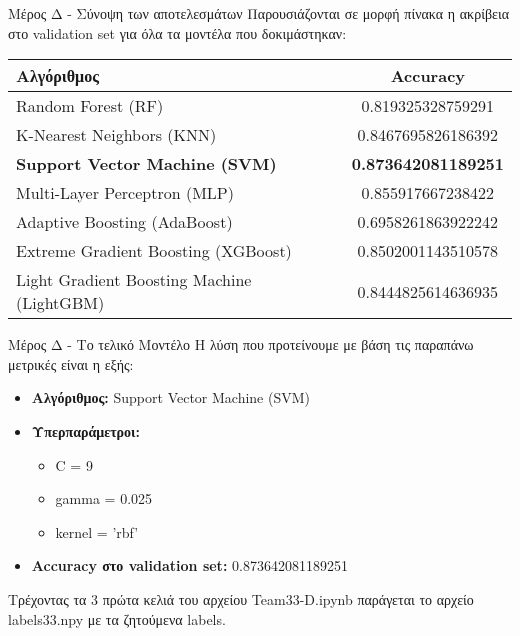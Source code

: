 \documentclass{beamer}
\begin{document}
\begin{frame}{Μέρος Δ - Σύνοψη των αποτελεσμάτων}
   Παρουσιάζονται σε μορφή πίνακα η ακρίβεια στο validation set για όλα τα μοντέλα που δοκιμάστηκαν:
    \begin{table}[h!]
\centering
\begin{tabular}{|l|c|}
\hline
\textbf{Αλγόριθμος} & \textbf{Accuracy} \\ \hline
Random Forest (RF) & 0.819325328759291\\ \hline
K-Nearest Neighbors (KNN) & 0.8467695826186392\\ \hline
\textbf{Support Vector Machine (SVM)} & \textbf{0.873642081189251}\\ \hline
Multi-Layer Perceptron (MLP) & 0.855917667238422\\ \hline
Adaptive Boosting (AdaBoost) & 0.6958261863922242\\ \hline
Extreme Gradient Boosting (XGBoost) & 0.8502001143510578 \\ \hline
Light Gradient Boosting Machine (LightGBM) & 0.8444825614636935\\ \hline
\end{tabular}

\end{table}
\end{frame}

\begin{frame}{Μέρος Δ - Το τελικό Μοντέλο}
    Η λύση που προτείνουμε με βάση τις παραπάνω μετρικές είναι η εξής:
    \begin{itemize}
        \item \textbf{Αλγόριθμος:} Support Vector Machine (SVM)
        \item \textbf{Υπερπαράμετροι:} 
            \begin{itemize}
                \item C = 9
                \item gamma = 0.025
                \item kernel = 'rbf'
            \end{itemize}
        \item \textbf{Accuracy στο validation set:} 0.873642081189251
    \end{itemize}
    Τρέχοντας τα 3 πρώτα κελιά του αρχείου Team33-D.ipynb παράγεται το αρχείο labels33.npy με τα ζητούμενα labels.
\end{frame}
\end{document}
